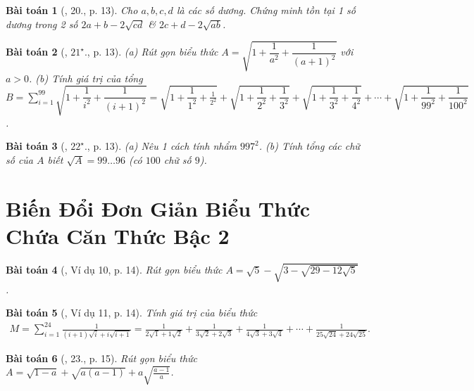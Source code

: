 \documentclass{article}
\newtheorem{baitoan}{Bài toán}
\begin{document}
\begin{baitoan}[\cite{Binh_Toan_9_tap_1}, 20., p. 13]
	Cho $a,b,c,d$ là các số dương. Chứng minh tồn tại 1 số dương trong 2 số $2a + b - 2\sqrt{cd}$ \& $2c + d - 2\sqrt{ab}$.
\end{baitoan}

\begin{baitoan}[\cite{Binh_Toan_9_tap_1}, $21^\star$., p. 13]
	(a) Rút gọn biểu thức $A = \sqrt{1 + \dfrac{1}{a^2} + \dfrac{1}{(a + 1)^2}}$ với $a > 0$. (b) Tính giá trị của tổng $B = \sum_{i=1}^{99} \sqrt{1 + \dfrac{1}{i^2} + \dfrac{1}{(i + 1)^2}} = \sqrt{1 + \dfrac{1}{1^2} + \frac{1}{2^2}} + \sqrt{1 + \dfrac{1}{2^2} + \dfrac{1}{3^2}} + \sqrt{1 + \dfrac{1}{3^2} + \dfrac{1}{4^2}} + \cdots + \sqrt{1 + \dfrac{1}{99^2} + \dfrac{1}{100^2}}$.
\end{baitoan}

\begin{baitoan}[\cite{Binh_Toan_9_tap_1}, $22^\star$., p. 13]
	(a) Nêu 1 cách tính nhẩm $997^2$. (b) Tính tổng các chữ số của $A$ biết $\sqrt{A} = 99\ldots96$ (có $100$ chữ số $9$).
\end{baitoan}


\section{Biến Đổi Đơn Giản Biểu Thức Chứa Căn Thức Bậc 2}

\begin{baitoan}[\cite{Binh_Toan_9_tap_1}, Ví dụ 10, p. 14]
	Rút gọn biểu thức $A = \sqrt{5} - \sqrt{3 - \sqrt{29 - 12\sqrt{5}}}$.
\end{baitoan}

\begin{baitoan}[\cite{Binh_Toan_9_tap_1}, Ví dụ 11, p. 14]
	Tính giá trị của biểu thức
	\begin{align*}
		M = \sum_{i=1}^{24} \frac{1}{(i + 1)\sqrt{i} + i\sqrt{i + 1}} = \frac{1}{2\sqrt{1} + 1\sqrt{2}} + \frac{1}{3\sqrt{2} + 2\sqrt{3}} + \frac{1}{4\sqrt{3} + 3\sqrt{4}} + \cdots + \frac{1}{25\sqrt{24} + 24\sqrt{25}}.
	\end{align*}
\end{baitoan}

\begin{baitoan}[\cite{Binh_Toan_9_tap_1}, 23., p. 15]
	Rút gọn biểu thức $A = \sqrt{1 - a} + \sqrt{a(a - 1)} + a\sqrt{\frac{a - 1}{a}}$.
\end{baitoan}
\end{document}

